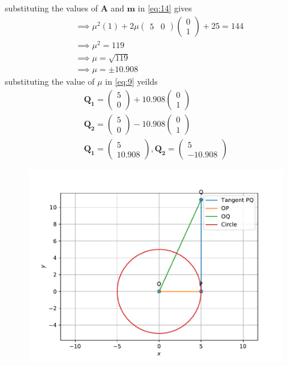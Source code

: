 \documentclass[12pt]{article}
\newcommand{\myvec}[1]{\ensuremath{\begin{pmatrix}#1\end{pmatrix}}}
\let\vec\mathbf
\begin{document}
\begin{enumerate}
		substituting the values of $\vec{A}$ and $\vec{m}$ in \eqref{eq:14} gives
\begin{align}
	&\implies\mu^2(1)+2\mu\myvec{5&0}\myvec{0\\1}+25=144\\
	&\implies\mu^2=119\\
	&\implies\mu=\sqrt{119}\\
	&\implies\mu=\pm10.908
\end{align}
		substituting the value of $\mu$ in \eqref{eq:9} yeilds 
\begin{align}
	\vec{Q_1}=\myvec{5\\0}+10.908\myvec{0\\1}\\
	\vec{Q_2}=\myvec{5\\0}-10.908\myvec{0\\1}\\
	\vec{Q_1}=\myvec{5\\10.908},\vec{Q_2}=\myvec{5\\-10.908}
\end{align}
\begin{figure}[!h]
\begin{center}
\includegraphics[width=\columnwidth]{figs/fig2.pdf}
\end{center}
\caption{}
\label{fig:Fig1}
\end{figure}
\end{enumerate}
\end{document}
